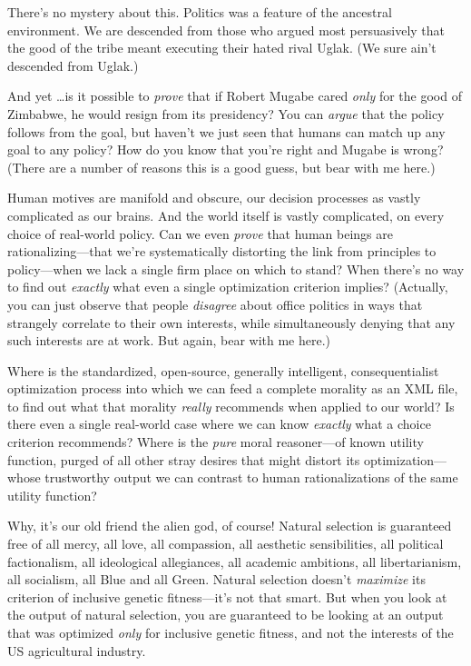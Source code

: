 {
 There's no mystery about this. Politics was a
feature of the ancestral environment. We are descended from those who
argued most persuasively that the good of the tribe meant executing
their hated rival Uglak. (We sure ain't descended from
Uglak.)}

{
 And yet \ldots is it possible to \textit{prove} that if Robert
Mugabe cared \textit{only} for the good of Zimbabwe, he would resign
from its presidency? You can \textit{argue} that the policy follows
from the goal, but haven't we just seen that humans can
match up any goal to any policy? How do you know that
you're right and Mugabe is wrong? (There are a number
of reasons this is a good guess, but bear with me here.)}

{
 Human motives are manifold and obscure, our decision processes as
vastly complicated as our brains. And the world itself is vastly
complicated, on every choice of real-world policy. Can we even
\textit{prove} that human beings are rationalizing---that
we're systematically distorting the link from
principles to policy---when we lack a single firm place on which to
stand? When there's no way to find out \textit{exactly}
what even a single optimization criterion implies? (Actually, you can
just observe that people \textit{disagree} about office politics in
ways that strangely correlate to their own interests, while
simultaneously denying that any such interests are at work. But again,
bear with me here.)}

{
 Where is the standardized, open-source, generally intelligent,
consequentialist optimization process into which we can feed a complete
morality as an XML file, to find out what that morality \textit{really}
recommends when applied to our world? Is there even a single real-world
case where we can know \textit{exactly} what a choice criterion
recommends? Where is the \textit{pure} moral reasoner---of known
utility function, purged of all other stray desires that might distort
its optimization---whose trustworthy output we can contrast to human
rationalizations of the same utility function?}

{
 Why, it's our old friend the alien god, of course!
Natural selection is guaranteed free of all mercy, all love, all
compassion, all aesthetic sensibilities, all political factionalism,
all ideological allegiances, all academic ambitions, all
libertarianism, all socialism, all Blue and all Green. Natural
selection doesn't \textit{maximize} its criterion of
inclusive genetic fitness---it's not that smart. But
when you look at the output of natural selection, you are guaranteed to
be looking at an output that was optimized \textit{only} for inclusive
genetic fitness, and not the interests of the US agricultural
industry.}

